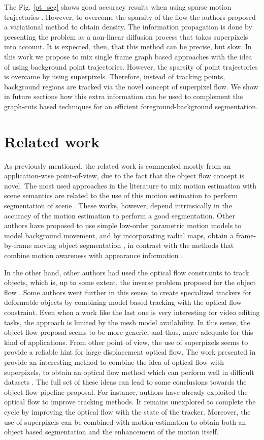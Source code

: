 The Fig. \ref{pt_seg} shows good accuracy results when using sparse motion trajectories \cite{c34}. However, to overcome 
the sparsity of the flow the authors proposed a variational method to obtain density. The information propagation is done 
by presenting the problem as a non-linear diffusion process that takes superpixels into account. It is expected, then, that this 
method can be precise, but slow.
In this work we propose to mix single frame graph based approaches with the idea 
of using background point trajectories. However, the sparsity of point trajectories is 
overcame by using superpixels. Therefore, instead of tracking points, background regions are tracked via the novel concept of 
superpixel flow. 
We show in future sections how this extra information can be used to complement the
graph-cuts based techniques for an efficient foreground-background segmentation. 

\section{Related work}

As previously mentioned, the related work is commented mostly from an application-wise point-of-view, due to the fact that 
the object flow concept is novel. The most used approaches in the literature to mix motion estimation with scene semantics 
are related to the use of this motion estimation to perform segmentation of scene \cite{c33}\cite{c34}. These works, however, depend 
intrinsically in the accuracy of the motion estimation to perform a good segmentation. Other authors have proposed to use simple 
low-order parametric motion models to model background movement, and by incorporating radial maps, obtain a frame-by-frame 
moving object segmentation \cite{c36}, in contrast with the methods that combine motion awareness with appearance information \cite{c35}. 

In the other hand, other authors had used the optical flow constraints to track objects, 
which is, up to some extent, the inverse problem proposed for the object flow \cite{c37}. Some authors went further in this sense, to create specialized trackers 
for deformable objects by combining model based tracking with the optical flow constraint. Even when a work like the last one is very interesting for video editing 
tasks, the approach is limited by the mesh model availability. In this sense, the object flow proposal seems to be more generic, and thus, more adequate for this kind 
of applications.
From other point of view, the use of superpixels seems to provide a reliable hint for large displacement optical flow. The work presented in \cite{c39} 
provide an interesting method to combine the idea of optical flow with superpixels, to obtain an optical flow method which can perform well in difficult datasets \cite{c27}. 
The full set of these ideas can lead to some conclusions towards the object flow pipeline proposal. For instance, authors have already exploited the optical flow 
to improve tracking methods. It remains unexplored to complete the cycle by improving the optical flow with the state of the tracker. Moreover, the use of superpixels 
can be combined with motion estimation to obtain both an object based segmentation and the enhancement of the motion itself.

